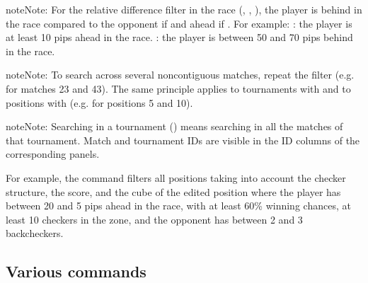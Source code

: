 \documentclass[letterpaper,10pt,english]{sphinxmanual}
\begin{document}
\begin{sphinxadmonition}{note}{Note:}
\sphinxAtStartPar
For the relative difference filter in the race (, , ), the player is behind in the race compared to the opponent if  and ahead if . For example: : the player is at least 10 pips ahead in the race. : the player is between 50 and 70 pips behind in the race.
\end{sphinxadmonition}

\begin{sphinxadmonition}{note}{Note:}
\sphinxAtStartPar
To search across several non\sphinxhyphen{}contiguous matches, repeat the  filter (e.g.  for matches 23 and 43). The same principle applies to tournaments with  and to positions with  (e.g.  for positions 5 and 10).
\end{sphinxadmonition}

\begin{sphinxadmonition}{note}{Note:}
\sphinxAtStartPar
Searching in a tournament () means searching in all the matches of that tournament. Match and tournament IDs are visible in the ID columns of the corresponding panels.
\end{sphinxadmonition}

\sphinxAtStartPar
For example, the command  filters all positions taking into account the checker structure, the score, and the cube of the edited position where the player has between 20 and 5 pips ahead in the race, with at least 60\% winning chances, at least 10 checkers in the zone, and the opponent has between 2 and 3 backcheckers.


\subsection{Various commands}
\label{\detokenize{cmd_mode:commandes-diverses}}\label{\detokenize{cmd_mode:cmd-misc}}
\end{document}
